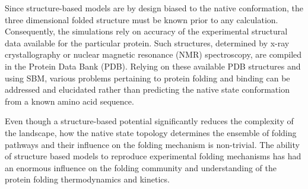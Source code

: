 \documentclass[../talant.diss.submit.tex]{subfiles}
\begin{document}
Since structure-based models are by design biased to the native conformation,
the three dimensional folded structure must be known prior to any calculation.
Consequently, the simulations rely on accuracy of the experimental structural
data available for the particular protein. Such structures, determined by x-ray
crystallography or nuclear magnetic resonance (NMR) spectroscopy, are compiled
in the Protein Data Bank (PDB).\cite{le-gall:07} Relying on these available PDB
structures and using SBM, various problems pertaining to protein folding and
binding can be addressed and elucidated rather than predicting the native state
conformation from a known amino acid sequence.


Even though a structure-based potential significantly reduces the complexity of
the landscape, how the native state topology determines the ensemble of folding
pathways and their influence on the folding mechanism is non-trivial.  The
ability of structure based models to reproduce experimental folding mechanisms
has had an enormous influence on the folding community and understanding of the
protein folding thermodynamics and kinetics.


%

%
\end{document}
